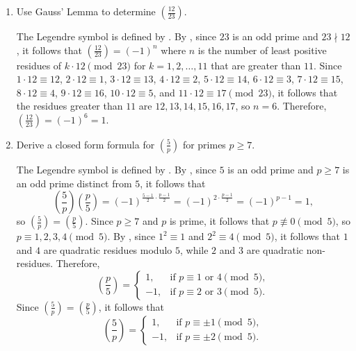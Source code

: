 \begin{enumerate}
  \item Use Gauss' Lemma to determine $\left(\frac{12}{23}\right)$.
  \begin{subanswer}
    The Legendre symbol is defined by .
    By , since $23$ is an odd prime and $23 \nmid 12$, it follows that $\left(\frac{12}{23}\right) = (-1)^n$ where $n$ is the number of least positive residues of $k \cdot 12 \pmod{23}$ for $k=1,2,\ldots,11$ that are greater than $11$.
    Since $1 \cdot 12 \equiv 12$, $2 \cdot 12 \equiv 1$, $3 \cdot 12 \equiv 13$, $4 \cdot 12 \equiv 2$, $5 \cdot 12 \equiv 14$, $6 \cdot 12 \equiv 3$, $7 \cdot 12 \equiv 15$, $8 \cdot 12 \equiv 4$, $9 \cdot 12 \equiv 16$, $10 \cdot 12 \equiv 5$, and $11 \cdot 12 \equiv 17 \pmod{23}$, it follows that the residues greater than $11$ are $12, 13, 14, 15, 16, 17$, so $n=6$.
    Therefore, $\left(\frac{12}{23}\right) = (-1)^6 = 1$.
  \end{subanswer}


  
  \newpage
  \item Derive a closed form formula for $\left(\frac{5}{p}\right)$ for primes $p \geq 7$.
  \begin{subanswer}
    The Legendre symbol is defined by .
    By , since $5$ is an odd prime and $p \geq 7$ is an odd prime distinct from $5$, it follows that
    \[
    \left(\frac{5}{p}\right)\left(\frac{p}{5}\right) = (-1)^{\frac{5-1}{2}\cdot\frac{p-1}{2}} = (-1)^{2\cdot\frac{p-1}{2}} = (-1)^{p-1} = 1,
    \]
    so $\left(\frac{5}{p}\right) = \left(\frac{p}{5}\right)$.
    Since $p \geq 7$ and $p$ is prime, it follows that $p \not\equiv 0 \pmod{5}$, so $p \equiv 1, 2, 3, 4 \pmod{5}$.
    By , since $1^2 \equiv 1$ and $2^2 \equiv 4 \pmod{5}$, it follows that $1$ and $4$ are quadratic residues modulo $5$, while $2$ and $3$ are quadratic non-residues.
    Therefore,
    \[
    \left(\frac{p}{5}\right) = \begin{cases}
    1, & \text{if } p \equiv 1 \text{ or } 4 \pmod{5},\\
    -1, & \text{if } p \equiv 2 \text{ or } 3 \pmod{5}.
    \end{cases}
    \]
    Since $\left(\frac{5}{p}\right) = \left(\frac{p}{5}\right)$, it follows that
    \[
    \left(\frac{5}{p}\right) = \begin{cases}
    1, & \text{if } p \equiv \pm 1 \pmod{5},\\
    -1, & \text{if } p \equiv \pm 2 \pmod{5}.
    \end{cases}
    \]
  \end{subanswer}


\end{enumerate}
